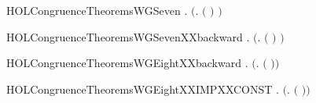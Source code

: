 \begin{SaveVerbatim}{HOLCongruenceTheoremsWGSeven}
\HOLTokenTurnstile{} \HOLSymConst{\HOLTokenForall{}} .   \HOLSymConst{\HOLTokenImp{}}  \ensuremath{(}\HOLTokenLambda{}.  \ensuremath{(} \ensuremath{)} \ensuremath{)}
\end{SaveVerbatim}
\newcommand{\HOLCongruenceTheoremsWGSeven}{\UseVerbatim{HOLCongruenceTheoremsWGSeven}}
\begin{SaveVerbatim}{HOLCongruenceTheoremsWGSevenXXbackward}
\HOLTokenTurnstile{} \HOLSymConst{\HOLTokenForall{}} .  \ensuremath{(}\HOLTokenLambda{}.  \ensuremath{(} \ensuremath{)} \ensuremath{)} \HOLSymConst{\HOLTokenImp{}}  
\end{SaveVerbatim}
\newcommand{\HOLCongruenceTheoremsWGSevenXXbackward}{\UseVerbatim{HOLCongruenceTheoremsWGSevenXXbackward}}
\begin{SaveVerbatim}{HOLCongruenceTheoremsWGEightXXbackward}
\HOLTokenTurnstile{} \HOLSymConst{\HOLTokenForall{}} .  \ensuremath{(}\HOLTokenLambda{}.   \ensuremath{(} \ensuremath{)}\ensuremath{)} \HOLSymConst{\HOLTokenImp{}}  
\end{SaveVerbatim}
\newcommand{\HOLCongruenceTheoremsWGEightXXbackward}{\UseVerbatim{HOLCongruenceTheoremsWGEightXXbackward}}
\begin{SaveVerbatim}{HOLCongruenceTheoremsWGEightXXIMPXXCONST}
\HOLTokenTurnstile{} \HOLSymConst{\HOLTokenForall{}} .  \ensuremath{(}\HOLTokenLambda{}.   \ensuremath{(} \ensuremath{)}\ensuremath{)} \HOLSymConst{\HOLTokenImp{}}  
\end{SaveVerbatim}
\newcommand{\HOLCongruenceTheoremsWGEightXXIMPXXCONST}{\UseVerbatim{HOLCongruenceTheoremsWGEightXXIMPXXCONST}}
